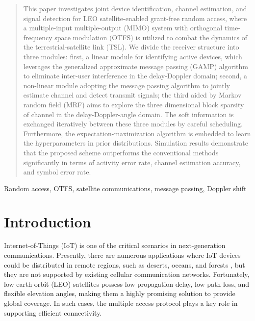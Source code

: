 \documentclass[conference]{IEEEtran}
\begin{document}
	\begin{abstract}
		This paper investigates joint device identification, channel estimation, and signal detection for LEO satellite-enabled grant-free random access, where a multiple-input multiple-output (MIMO) system with orthogonal time-frequency space modulation (OTFS) is utilized to combat the dynamics of the terrestrial-satellite link (TSL).
		We divide the receiver structure into three modules: 
		first, a linear module for identifying active devices, which leverages the generalized approximate message passing (GAMP) algorithm to eliminate inter-user interference in the delay-Doppler domain; second, a non-linear module adopting the message passing algorithm to jointly estimate channel and detect transmit signals; the third aided by Markov random field (MRF) aims to explore the three dimensional block sparsity of channel in the delay-Doppler-angle domain. The soft information is exchanged iteratively between these three modules by careful scheduling. Furthermore, the expectation-maximization algorithm is embedded to learn the hyperparameters in prior distributions. Simulation results demonstrate that the proposed scheme outperforms the conventional methods significantly in terms of activity error rate, channel estimation accuracy, and symbol error rate. 
	\end{abstract}
	
	\begin{IEEEkeywords}
		Random access, OTFS, satellite communications, message passing, Doppler shift
	\end{IEEEkeywords}
	
	\section{Introduction}
	 Internet-of-Things (IoT) is one of the critical scenarios in next-generation communications. Presently, there are numerous applications where IoT devices could be distributed in remote regions, such as deserts, oceans, and forests \cite{s41}, but they are not supported by existing cellular communication networks. Fortunately, low-earth orbit (LEO) satellites possess low propagation delay, low path loss, and flexible elevation angles, making them a highly promising solution to provide global coverage. In such cases, the multiple access protocol plays a key role in supporting efficient connectivity.
	
\end{document}
